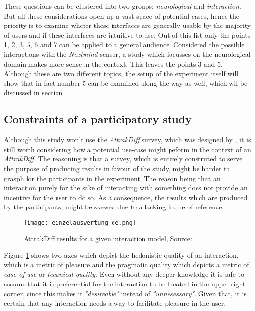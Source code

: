                 These questions can be clustered into two groups: \textit{neurological} and \textit{interaction}. But all these considerations open up a vast space of potential cases, hence the priority is to examine wheter these interfaces are generally usable by the majority of users and if these interfaces are intuitive to use. Out of this list only the points 1, 2, 3, 5, 6 and 7 can be applied to a general audience. Considered the possible interactions with the \textit{Nextmind} sensor, a study which focusses on the neurological domain makes more sense in the context.  This leaves the points 3 and 5. Although these are two different topics, the setup of the experiment itself will show that in fact number 5 can be examined along the way as well, which wil be discussed in section 

            \subsection{Constraints of a participatory study}
            
                Although this study won't use the \textit{AttrakDiff} survey, which was designed by \cite{Hassenzahl.30092020}, it is still worth considering how a potential use-case might peform in the context of an \textit{AttrakDiff}. The reasoning is that a survey, which is entirely construted to serve the purpose of producing results in favour of the study, might be harder to grasph for the participants in the experiment. The reason being that an interaction purely for the sake of interacting with something does not provide an incentive for the user to do so. As a consequence, the results which are produced by the participants, might be skewed due to a lacking frame of reference.

                \begin{figure}[h]     %
                    \centering
                    \texttt{[image: einzelauswertung\_de.png]} 
                    \caption{ AttrakDiff results for a given interaction model, Source: \cite{Hassenzahl.30092020}}\label{AttrakDiff}
                \end{figure}

                Figure \ref*{AttrakDiff} shows two axes which depict the hedonistic quality of an interaction, which is a metric of pleasure and the pragmatic quality which depicts a metric of \textit{ease of use} or \textit{technical quality}. Even without any deeper knowledge it is safe to assume that it is preferential for the interaction to be located in the upper right corner, since this makes it \textit{"desireable"} instead of \textit{"unnesessary"}. Given that, it is certain that any interaction needs a way to facilitate pleasure in the user.

